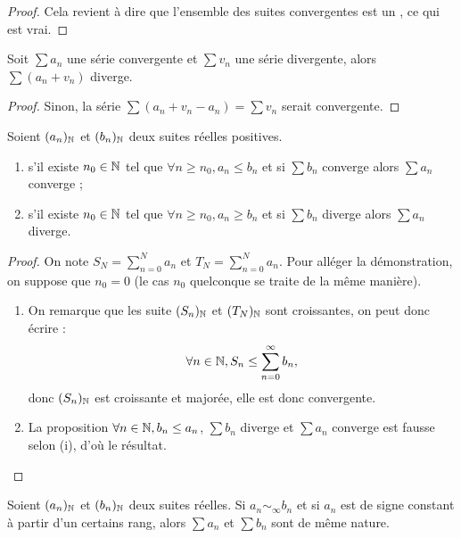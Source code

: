 \documentclass[french]{article}
\begin{document}
\begin{proof}
Cela revient à dire que l'ensemble des suites convergentes est un \Kev, ce qui est vrai.
\end{proof}

\begin{coro}
Soit $\sum a_n$ une série convergente et $\sum v_n$ une série divergente, alors $\sum (a_n+v_n)$ diverge.
\end{coro}

\begin{proof}
Sinon, la série $\sum( a_n + v_n - a_n) = \sum v_n$ serait convergente.
\end{proof}

\begin{thm}
Soient $(a_n)_{\mathbb{N}}$ et $(b_n)_{\mathbb{N}}$ deux suites réelles positives.
\begin{enumerate}[label=(\roman*)]
\item s'il existe $n_0 \in \mathbb{N}$ tel que $\forall n \geq n_0, a_n \leq b_n$ et si $\sum b_n$ converge alors $\sum a_n$ converge ;
\item s'il existe $n_0 \in \mathbb{N}$ tel que $\forall n \geq n_0, a_n \geq b_n$ et si $\sum b_n$ diverge alors $\sum a_n$ diverge.
\end{enumerate}
\end{thm}

\begin{proof}
On note $S_N = \sum_{n=0}^N a_n$ et $T_N = \sum_{n=0}^N a_n$. 
Pour alléger la démonstration, on suppose que $n_0 = 0$ (le cas $n_0$ quelconque se traite de la même manière).
\begin{enumerate}[label=(\roman*)]
\item On remarque que les suite $(S_n)_{\mathbb{N}}$ et $(T_N)_{\mathbb{N}}$ sont croissantes, on peut donc écrire :
\[ \forall n \in \mathbb{N}, S_n \leq \sum_{n=0}^{\infty} b_n, \] 
donc $(S_n)_{\mathbb{N}}$ est croissante et majorée, elle est donc convergente.
\item La proposition $\forall n \in \mathbb{N}, b_n \leq a_n$, $\sum b_n$ diverge et $\sum a_n$ converge est fausse selon (i), d'où le résultat.
\end{enumerate}
\end{proof}

\begin{thm}
Soient $(a_n)_{\mathbb{N}}$ et $(b_n)_{\mathbb{N}}$ deux suites réelles. Si $a_n \sim_{\infty} b_n$ et si $a_n$ est de signe constant à partir d'un certains rang,
alors $\sum a_n$ et $\sum b_n$ sont de même nature.
\end{thm}
\end{document}
